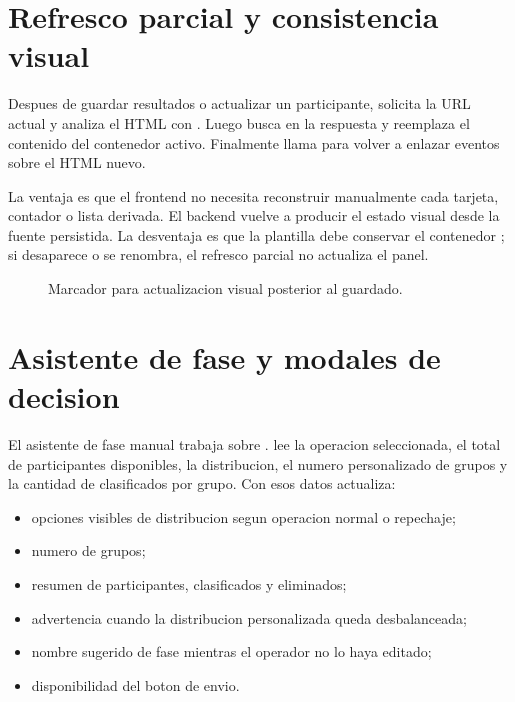 \section{Refresco parcial y consistencia visual}
\label{sec:javascript-refresco-parcial}

Despues de guardar resultados o actualizar un participante,  solicita la URL actual y analiza el HTML con . Luego busca  en la respuesta y reemplaza el contenido del contenedor activo. Finalmente llama  para volver a enlazar eventos sobre el HTML nuevo.

La ventaja es que el frontend no necesita reconstruir manualmente cada tarjeta, contador o lista derivada. El backend vuelve a producir el estado visual desde la fuente persistida. La desventaja es que la plantilla debe conservar el contenedor ; si desaparece o se renombra, el refresco parcial no actualiza el panel.

\begin{figure}[H]
  \centering
  \caption{Marcador para actualizacion visual posterior al guardado.}
  \label{fig:javascript-refresco-visual}
\end{figure}

\section{Asistente de fase y modales de decision}
\label{sec:javascript-asistente-fase}

El asistente de fase manual trabaja sobre .  lee la operacion seleccionada, el total de participantes disponibles, la distribucion, el numero personalizado de grupos y la cantidad de clasificados por grupo. Con esos datos actualiza:

\begin{itemize}
  \item opciones visibles de distribucion segun operacion normal o repechaje;
  \item numero de grupos;
  \item resumen de participantes, clasificados y eliminados;
  \item advertencia cuando la distribucion personalizada queda desbalanceada;
  \item nombre sugerido de fase mientras el operador no lo haya editado;
  \item disponibilidad del boton de envio.
\end{itemize}

